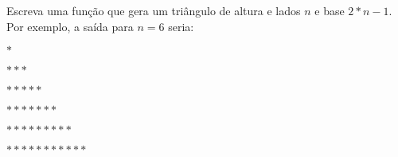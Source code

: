
\question[10]

Escreva uma função que gera um triângulo de altura e lados $n$ e base $2*n-1$. Por exemplo, a saída para $n = 6$ seria:

\begin{exemplo}{}{}
\hspace{3.5em} $*$ \par
\hspace{2.8em} $***$ \par
\hspace{2.1em} $*****$ \par
\hspace{1.4em} $*******$ \par
\hspace{0.7em} $*********$  \par
\hspace{0em} $***********$
\end{exemplo}
